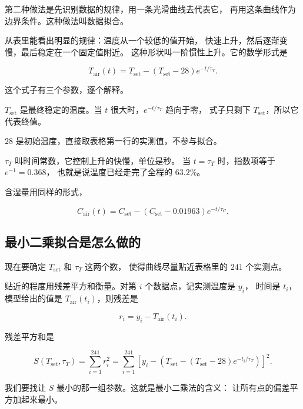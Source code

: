 第二种做法是先识别数据的规律，用一条光滑曲线去代表它，
再用这条曲线作为边界条件。这种做法叫数据拟合。

从表里能看出明显的规律：温度从一个较低的值开始，
快速上升，然后逐渐变慢，最后稳定在一个固定值附近。
这种形状叫一阶惯性上升。它的数学形式是

\begin{equation}
T_{\mathrm{air}}(t)=T_{\mathrm{set}}-\left(T_{\mathrm{set}}-28\right)e^{-t/\tau_T}.
\label{eq:fitted-T}
\end{equation}

这个式子有三个参数，逐个解释。

$T_{\mathrm{set}}$ 是最终稳定的温度。当 $t$ 很大时，$e^{-t/\tau_T}$ 趋向于零，
式子只剩下 $T_{\mathrm{set}}$，所以它代表终值。

$28$ 是初始温度，直接取表格第一行的实测值，不参与拟合。

$\tau_T$ 叫时间常数，它控制上升的快慢，单位是秒。
当 $t=\tau_T$ 时，指数项等于 $e^{-1}=0.368$，
也就是说温度已经走完了全程的 $63.2\%$。

含湿量用同样的形式，

\begin{equation}
C_{\mathrm{air}}(t)=C_{\mathrm{set}}-\left(C_{\mathrm{set}}-0.01963\right)e^{-t/\tau_C}.
\label{eq:fitted-C}
\end{equation}

\subsection{最小二乘拟合是怎么做的}

现在要确定 $T_{\mathrm{set}}$ 和 $\tau_T$ 这两个数，
使得曲线尽量贴近表格里的 $241$ 个实测点。

贴近的程度用残差平方和衡量。对第 $i$ 个数据点，记实测温度是 $y_i$，
时间是 $t_i$，模型给出的值是 $T_{\mathrm{air}}(t_i)$，则残差是

\begin{equation}
r_i = y_i - T_{\mathrm{air}}(t_i).
\end{equation}

残差平方和是

\begin{equation}
S(T_{\mathrm{set}},\tau_T)=\sum_{i=1}^{241} r_i^2
= \sum_{i=1}^{241}\left[y_i-\left(T_{\mathrm{set}}-\left(T_{\mathrm{set}}-28\right)e^{-t_i/\tau_T}\right)\right]^2 .
\label{eq:lsq}
\end{equation}

我们要找让 $S$ 最小的那一组参数。这就是最小二乘法的含义：
让所有点的偏差平方加起来最小。

